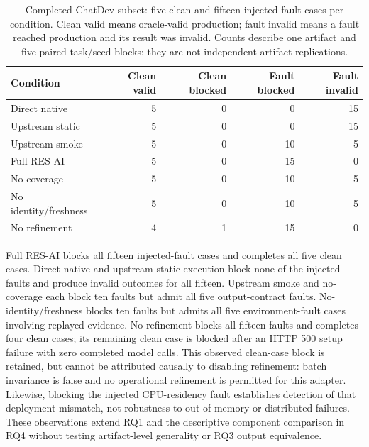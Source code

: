 \documentclass[pdflatex,sn-mathphys-num]{sn-jnl}
\theoremstyle{thmstylethree}
\newcommand{\tool}{\textsc{RES-AI}}
\begin{document}
\begin{table}[t]
\caption{Completed ChatDev subset: five clean and fifteen injected-fault cases per condition. Clean valid means oracle-valid production; fault invalid means a fault reached production and its result was invalid. Counts describe one artifact and five paired task/seed blocks; they are not independent artifact replications.}\label{tab:chatdev}
\centering\small\setlength{\tabcolsep}{3pt}

\begin{tabular}{lrrrr}
\toprule
Condition & Clean valid & Clean blocked & Fault blocked & Fault invalid \\
\midrule
Direct native & 5 & 0 & 0 & 15 \\
Upstream static & 5 & 0 & 0 & 15 \\
Upstream smoke & 5 & 0 & 10 & 5 \\
Full \tool{} & 5 & 0 & 15 & 0 \\
No coverage & 5 & 0 & 10 & 5 \\
No identity/freshness & 5 & 0 & 10 & 5 \\
No refinement & 4 & 1 & 15 & 0 \\
\bottomrule
\end{tabular}


\end{table}

Full \tool{} blocks all fifteen injected-fault cases and completes all five clean cases. Direct native and upstream static execution block none of the injected faults and produce invalid outcomes for all fifteen. Upstream smoke and no-coverage each block ten faults but admit all five output-contract faults. No-identity/freshness blocks ten faults but admits all five environment-fault cases involving replayed evidence. No-refinement blocks all fifteen faults and completes four clean cases; its remaining clean case is blocked after an HTTP 500 setup failure with zero completed model calls. This observed clean-case block is retained, but cannot be attributed causally to disabling refinement: batch invariance is false and no operational refinement is permitted for this adapter. Likewise, blocking the injected CPU-residency fault establishes detection of that deployment mismatch, not robustness to out-of-memory or distributed failures. These observations extend RQ1 and the descriptive component comparison in RQ4 without testing artifact-level generality or RQ3 output equivalence.
\end{document}
